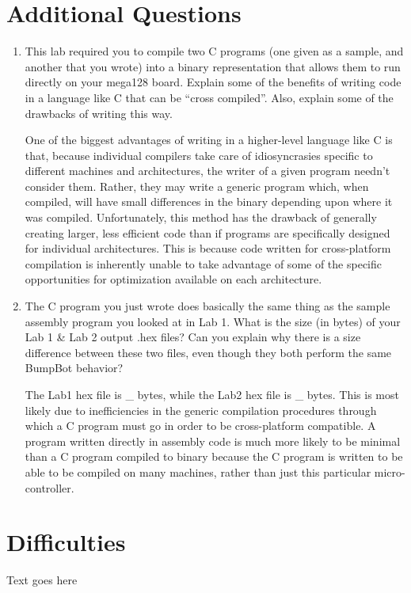 \documentclass[12pt,letterpaper]{article}
\begin{document}
\section{Additional Questions}
\begin{enumerate}
    \item
    This lab required you to compile two C programs (one given as a sample,
    and another that you wrote) into a binary representation that allows them to
    run directly on your mega128 board. Explain some of the benefits of writing
    code in a language like C that can be “cross compiled”. Also, explain some
    of the drawbacks of writing this way.

    One of the biggest advantages of writing in a higher-level language like C is that, because individual compilers take care of idiosyncrasies specific to different machines and architectures, the writer of a given program needn't consider them. Rather, they may write a generic program which, when compiled, will have small differences in the binary depending upon where it was compiled. Unfortunately, this method has the drawback of generally creating larger, less efficient code than if programs are specifically designed for individual architectures. This is because code written for cross-platform compilation is inherently unable to take advantage of some of the specific opportunities for optimization available on each architecture.

    \item
    The C program you just wrote does basically the same thing as the sample
    assembly program you looked at in Lab 1. What is the size (in bytes) of
    your Lab 1 \& Lab 2 output .hex files? Can you explain why there is a size
    difference between these two files, even though they both perform the same
    BumpBot behavior?

    The Lab1 hex file is \_ bytes, while the Lab2 hex file is \_ bytes. This is most likely due to inefficiencies in the generic compilation procedures through which a C program must go in order to be cross-platform compatible. A program written directly in assembly code is much more likely to be minimal than a C program compiled to binary because the C program is written to be able to be compiled on many machines, rather than just this particular micro-controller.
    
\end{enumerate}

\section{Difficulties}
Text goes here
\end{document}
